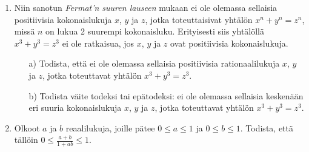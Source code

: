 \begin{enumerate}
\item
Niin sanotun {\em Fermat'n suuren lauseen} mukaan ei ole
olemassa sellaisia positiivisia kokonaislukuja $x$, $y$
ja $z$, jotka toteuttaisivat yhtälön $x^{n} + y^{n} = z^{n}$, missä $n$ on lukua 2 suurempi kokonaisluku.
Erityisesti siis yhtälöllä $x^{3} + y^{3} = z^{3}$ ei
ole ratkaisua, jos $x$, $y$ ja $z$ ovat positiivisia
kokonaislukuja.
\begin{itemize}
\item[a)] Todista, että ei ole olemassa sellaisia
positiivisia rationaalilukuja $x$, $y$ ja $z$, jotka
toteuttavat yhtälön $x^{3} + y^{3} = z^{3}$.
\item[b)] Todista väite todeksi tai epätodeksi: ei ole
olemassa sellaisia keskenään eri suuria kokonaislukuja
$x$, $y$ ja $z$, jotka toteuttavat yhtälön $x^{3} + y^{3} = z^{3}$.
\end{itemize}

\item Olkoot $a$ ja $b$ reaalilukuja, joille pätee $0 \le a \le 1$ ja $0 \le b \le 1$. Todista, että tällöin $0 \le \frac{a + b}{1 + ab} \le 1$.

\end{enumerate}

